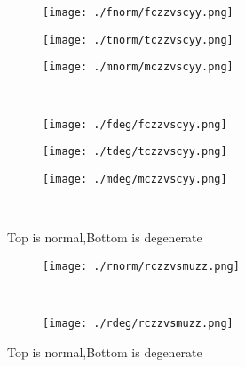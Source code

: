 \documentclass[aps,floats,floatfix,nofootinbib]{revtex4-1}
\begin{document}
\begin{center}
\begin{figure}
\begin{subfigure}{0.3\textwidth}
\texttt{[image: ./fnorm/fczzvscyy.png]}
\label{}
\end{subfigure}
\begin{subfigure}{0.3\textwidth}
\texttt{[image: ./tnorm/tczzvscyy.png]}
\label{}
\end{subfigure}
\begin{subfigure}{0.3\textwidth}
\texttt{[image: ./mnorm/mczzvscyy.png]}
\label{}
\end{subfigure}\\
\begin{subfigure}{0.3\textwidth}
\texttt{[image: ./fdeg/fczzvscyy.png]}
\label{}
\end{subfigure}
\begin{subfigure}{0.3\textwidth}
\texttt{[image: ./tdeg/tczzvscyy.png]}
\label{}
\end{subfigure}
\begin{subfigure}{0.3\textwidth}
\texttt{[image: ./mdeg/mczzvscyy.png]}
\label{}
\end{subfigure}\\
\caption{Top is normal,Bottom is degenerate}
\end{figure}
\end{center}

\begin{center}
\begin{figure}
\begin{subfigure}{1.0\textwidth}
\texttt{[image: ./rnorm/rczzvsmuzz.png]}
\label{}
\end{subfigure}\\
\begin{subfigure}{1.0\textwidth}
\texttt{[image: ./rdeg/rczzvsmuzz.png]}
\label{}
\end{subfigure}
\caption{Top is normal,Bottom is degenerate}
\end{figure}
\end{center}
\end{document}

